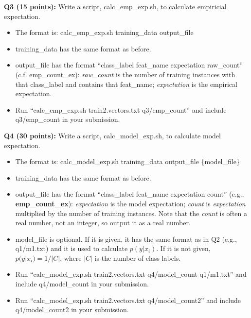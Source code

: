 \documentclass[11pt]{article}
\begin{document}
\vspace{0.4 in}

\noindent
{\bf Q3 (15 points):} Write a script, calc\_emp\_exp.sh,
   to calculate empiricial expectation.

\begin{itemize}
  \item The format is: 
                calc\_emp\_exp.sh training\_data output\_file

 \item training\_data has the same format as before.

 \item output\_file has the format ``class\_label feat\_name expectation raw\_count'' (c.f. emp\_count\_ex): {\it raw\_count} is the number of training instances with that class\_label and contains that feat\_name; {\it expectation} is the empirical expectation.
  
 \item Run ``calc\_emp\_exp.sh train2.vectors.txt 
             q3/emp\_count'' and include q3/emp\_count in your submission.
\end{itemize}


\vspace{0.4 in}

\noindent
{\bf Q4 (30 points):} Write a script, calc\_model\_exp.sh, to 
  calculate model expectation.

\begin{itemize}
  \item The format is: 
                calc\_model\_exp.sh training\_data output\_file \{model\_file\}

 \item training\_data has the same format as before. 
 
 \item output\_file has the format ``class\_label feat\_name expectation count'' (e.g., {\bf emp\_count\_ex}):  {\it expectation} is the model expectation; {\it count} is {\it expectation} multiplied by the number of training instances. Note that the {\it count} is often a real number, not an integer, so output it as a real number.


 \item model\_file is optional. If it is given, it has the same format as in Q2
       (e.g., q1/m1.txt) 
       and it is used to calculate $p(y|x_i)$. If it is not given,
       $p(y|x_i) = 1/|C|$, where $|C|$ is the number of class labels.

 \item Run ``calc\_model\_exp.sh train2.vectors.txt q4/model\_count
        q1/m1.txt'' and include q4/model\_count in your submission.
       
 \item Run ``calc\_model\_exp.sh train2.vectors.txt q4/model\_count2''
       and include q4/model\_count2 in your submission.
  
\end{itemize}
\end{document}
